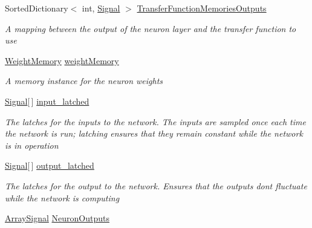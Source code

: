 \begin{DoxyCompactItemize}
Sorted\+Dictionary$<$ int, \hyperlink{class_n_n_gen_1_1_signal}{Signal} $>$ \hyperlink{class_n_n_gen_1_1_sync_neural_network_a76ca03cc953d58f1b392cb723fe3e86a}{Transfer\+Function\+Memories\+Outputs}
\begin{DoxyCompactList}\small\item\em A mapping between the output of the neuron layer and the transfer function to use \end{DoxyCompactList}\item 
\hyperlink{class_n_n_gen_1_1_weight_memory}{Weight\+Memory} \hyperlink{class_n_n_gen_1_1_sync_neural_network_a372529d19a342c3636c76319bc91af9a}{weight\+Memory}
\begin{DoxyCompactList}\small\item\em A memory instance for the neuron weights \end{DoxyCompactList}\item 
\hyperlink{class_n_n_gen_1_1_signal}{Signal}\mbox{[}$\,$\mbox{]} \hyperlink{class_n_n_gen_1_1_sync_neural_network_ac94c01526c4547dd8bf1e0b18d23dde9}{input\+\_\+latched}
\begin{DoxyCompactList}\small\item\em The latches for the inputs to the network. The inputs are sampled once each time the network is run; latching ensures that they remain constant while the network is in operation \end{DoxyCompactList}\item 
\hyperlink{class_n_n_gen_1_1_signal}{Signal}\mbox{[}$\,$\mbox{]} \hyperlink{class_n_n_gen_1_1_sync_neural_network_a9d1fb07536404577262d6c5ccecf2361}{output\+\_\+latched}
\begin{DoxyCompactList}\small\item\em The latches for the output to the network. Ensures that the outputs don\textquotesingle{}t fluctuate while the network is computing \end{DoxyCompactList}\item 
\hyperlink{class_n_n_gen_1_1_array_signal}{Array\+Signal} \hyperlink{class_n_n_gen_1_1_sync_neural_network_ad10e93be47aead04db2b445124bb6649}{Neuron\+Outputs}

\end{DoxyCompactItemize}
